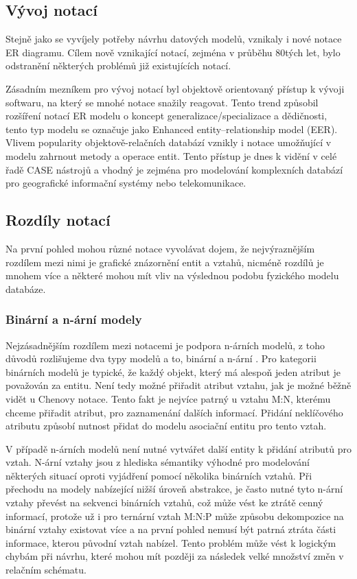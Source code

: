 \documentclass[czech,bachelor,public,dept460,male,oneside]{diploma}
\begin{document}
	
	\subsection{Vývoj notací}
	Stejně jako se vyvíjely potřeby návrhu datových modelů, vznikaly i nové notace ER diagramu. Cílem nově vznikající notací, zejména v průběhu 80tých let, bylo odstranění některých problémů již existujících notací. 
	
	Zásadním mezníkem pro vývoj notací byl objektově orientovaný přístup k vývoji softwaru, na který se mnohé notace snažily reagovat. Tento trend způsobil rozšíření notací ER modelu o koncept generalizace/specializace a dědičnosti, tento typ modelu se označuje jako  Enhanced entity–relationship model (EER). Vlivem popularity objektově-relačních databází vznikly i notace umožňující v modelu zahrnout metody a operace entit. Tento přístup je dnes k vidění v celé řadě CASE nástrojů a  vhodný je zejména pro modelování komplexních databází pro geografické informační systémy nebo telekomunikace.
	
	\subsection{Rozdíly notací}
	Na první pohled mohou různé notace vyvolávat dojem, že nejvýraznějším rozdílem mezi nimi je grafické znázornění entit a vztahů, nicméně rozdílů je mnohem více a některé mohou mít vliv na výslednou podobu fyzického modelu databáze.
	
	\subsubsection{Binární a n-ární modely}
	Nejzásadnějším rozdílem mezi notacemi je podpora n-árních modelů, z toho důvodů rozlišujeme dva typy modelů a to, binární a n-ární \cite{compErNotations}. Pro kategorii binárních modelů je typické, že každý objekt, který má alespoň jeden atribut je považován za entitu. Není tedy možné přiřadit atribut vztahu, jak je možné běžně vidět u Chenovy notace. Tento fakt je nejvíce patrný u vztahu M:N, kterému chceme přiřadit atribut, pro zaznamenání dalších informací. Přidání neklíčového atributu způsobí nutnost přidat do modelu asociační entitu pro tento vztah. 
	
	V případě n-árních modelů není nutné vytvářet další entity k přidání atributů pro vztah. N-ární vztahy jsou z hlediska sémantiky výhodné pro modelování některých situací oproti vyjádření pomocí několika binárních vztahů. Při přechodu na modely nabízející nižší úroveň abstrakce, je často nutné tyto n-ární vztahy převést na sekvenci binárních vztahů, což může vést ke ztrátě cenný informací, protože už i pro ternární vztah M:N:P může způsobu dekompozice na binární vztahy existovat více a na první pohled nemusí být patrná ztráta části informace, kterou původní vztah nabízel. Tento problém může vést k logickým chybám při návrhu, které mohou mít později za následek velké množství změn v relačním schématu.
	
\end{document}
